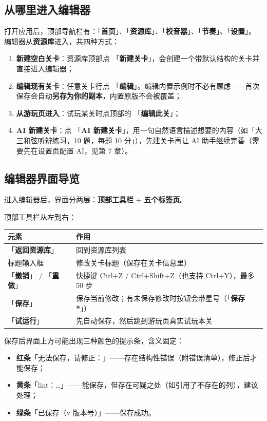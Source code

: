 \documentclass[UTF8,a4paper,zihao=-4]{ctexart}
\newcommand{\ui}[1]{「\textbf{#1}」}  %
\begin{document}
\subsection{从哪里进入编辑器}

打开应用后，顶部导航栏有：\ui{首页}、\ui{资源库}、\ui{校音器}、\ui{节奏}、\ui{设置}。
编辑器从\textbf{资源库}进入，共四种方式：

\begin{enumerate}[nosep]
  \item \textbf{新建空白关卡}：资源库顶部点 \ui{新建关卡}，会创建一个带默认结构的关卡并直接进入编辑器；
  \item \textbf{编辑现有关卡}：任意关卡行点 \ui{编辑}。编辑内置示例时不必有顾虑——首次保存会自动\textbf{另存为你的副本}，内置原版不会被覆盖；
  \item \textbf{从游玩页进入}：试玩某关时点顶部的 \ui{编辑此关}；
  \item \textbf{AI 新建关卡}：点 \ui{AI 新建关卡}，用一句自然语言描述想要的内容（如「大三和弦听辨练习，10 题，每题 10 分」），先建关卡再让 AI 助手继续完善（需要先在设置页配置 AI，见第 7 章）。
\end{enumerate}

\subsection{编辑器界面导览}

进入编辑器后，界面分两层：\textbf{顶部工具栏} + \textbf{五个标签页}。

顶部工具栏从左到右：

\begin{center}
\begin{tabular}{ll}
\toprule
元素 & 作用 \\
\midrule
\ui{返回资源库} & 回到资源库列表 \\
标题输入框 & 修改关卡标题（保存在关卡信息里） \\
\ui{撤销} / \ui{重做} & 快捷键 Ctrl+Z / Ctrl+Shift+Z（也支持 Ctrl+Y），最多 50 步 \\
\ui{保存} & 保存当前修改；有未保存修改时按钮会带星号（\ui{保存 *}） \\
\ui{试运行} & 先自动保存，然后跳到游玩页真实试玩本关 \\
\bottomrule
\end{tabular}
\end{center}

保存后界面上方可能出现三种颜色的提示条，含义固定：

\begin{itemize}[nosep]
  \item \textbf{红条}「无法保存，请修正：」——存在结构性错误（附错误清单），修正后才能保存；
  \item \textbf{黄条}「lint：\ldots」——能保存，但存在可疑之处（如引用了不存在的列），建议处理；
  \item \textbf{绿条}「已保存（v 版本号）」——保存成功。
\end{itemize}
\end{document}
